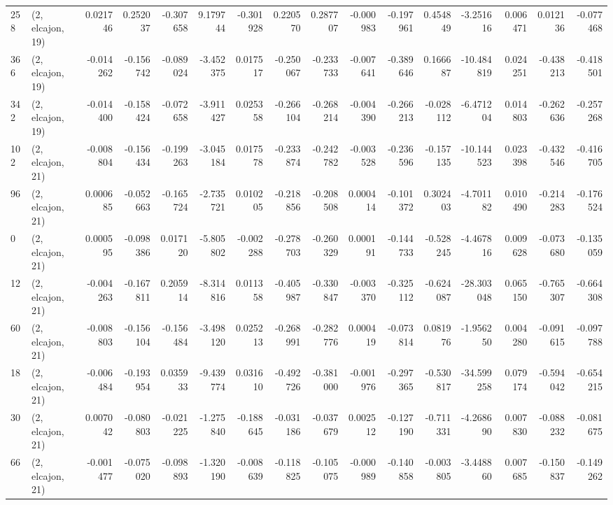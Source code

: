 \begin{tabular}{llrrrrrrrrrrrrrr}
258 &  (2, elcajon, 19) &   0.021746 &  0.252037 & -0.307658 &    9.179744 & -0.301928 &   0.220570 &  0.287707 & -0.000983 & -0.197961 &  0.454849 &    -3.251616 &  0.006471 &  0.012136 & -0.077468 \\
366 &  (2, elcajon, 19) &  -0.014262 & -0.156742 & -0.089024 &   -3.452375 &  0.017517 &  -0.250067 & -0.233733 & -0.007641 & -0.389646 &  0.166687 &   -10.484819 &  0.024251 & -0.438213 & -0.418501 \\
342 &  (2, elcajon, 19) &  -0.014400 & -0.158424 & -0.072658 &   -3.911427 &  0.025358 &  -0.266104 & -0.268214 & -0.004390 & -0.266213 & -0.028112 &    -6.471204 &  0.014803 & -0.262636 & -0.257268 \\
102 &  (2, elcajon, 21) &  -0.008804 & -0.156434 & -0.199263 &   -3.045184 &  0.017578 &  -0.233874 & -0.242782 & -0.003528 & -0.236596 & -0.157135 &   -10.144523 &  0.023398 & -0.432546 & -0.416705 \\
96  &  (2, elcajon, 21) &   0.000685 & -0.052663 & -0.165724 &   -2.735721 &  0.010205 &  -0.218856 & -0.208508 &  0.000414 & -0.101372 &  0.302403 &    -4.701182 &  0.010490 & -0.214283 & -0.176524 \\
0   &  (2, elcajon, 21) &   0.000595 & -0.098386 &  0.017120 &   -5.805802 & -0.002288 &  -0.278703 & -0.260329 &  0.000191 & -0.144733 & -0.528245 &    -4.467816 &  0.009628 & -0.073680 & -0.135059 \\
12  &  (2, elcajon, 21) &  -0.004263 & -0.167811 &  0.205914 &   -8.314816 &  0.011358 &  -0.405987 & -0.330847 & -0.003370 & -0.325112 & -0.624087 &   -28.303048 &  0.065150 & -0.765307 & -0.664308 \\
60  &  (2, elcajon, 21) &  -0.008803 & -0.156104 & -0.156484 &   -3.498120 &  0.025213 &  -0.268991 & -0.282776 &  0.000419 & -0.073814 &  0.081976 &    -1.956250 &  0.004280 & -0.091615 & -0.097788 \\
18  &  (2, elcajon, 21) &  -0.006484 & -0.193954 &  0.035933 &   -9.439774 &  0.031610 &  -0.492726 & -0.381000 & -0.001976 & -0.297365 & -0.530817 &   -34.599258 &  0.079174 & -0.594042 & -0.654215 \\
30  &  (2, elcajon, 21) &   0.007042 & -0.080803 & -0.021225 &   -1.275840 & -0.188645 &  -0.031186 & -0.037679 &  0.002512 & -0.127190 & -0.711331 &    -4.268690 &  0.007830 & -0.088232 & -0.081675 \\
66  &  (2, elcajon, 21) &  -0.001477 & -0.075020 & -0.098893 &   -1.320190 & -0.008639 &  -0.118825 & -0.105075 & -0.000989 & -0.140858 & -0.003805 &    -3.448860 &  0.007685 & -0.150837 & -0.149262 \\

\end{tabular}
